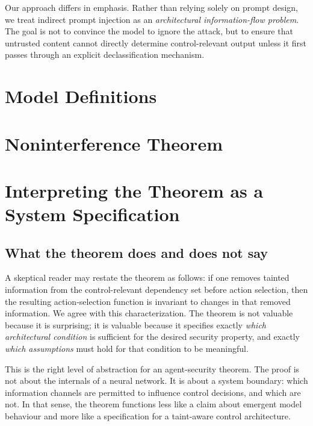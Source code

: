 \documentclass[11pt]{article}
\begin{document}
Our approach differs in emphasis. Rather than relying solely on prompt design,
we treat indirect prompt injection as an \emph{architectural information-flow
problem}. The goal is not to convince the model to ignore the attack, but to
ensure that untrusted content cannot directly determine control-relevant output
unless it first passes through an explicit declassification mechanism.

\section{Model Definitions}\label{sec:model}



\section{Noninterference Theorem}\label{sec:theorem}



\section{Interpreting the Theorem as a System Specification}
\label{sec:discussion}

\subsection{What the theorem does and does not say}

A skeptical reader may restate the theorem as follows: if one removes tainted
information from the control-relevant dependency set before action selection,
then the resulting action-selection function is invariant to changes in that
removed information. We agree with this characterization. The theorem is not
valuable because it is surprising; it is valuable because it specifies exactly
\emph{which architectural condition} is sufficient for the desired security
property, and exactly \emph{which assumptions} must hold for that condition to
be meaningful.

This is the right level of abstraction for an agent-security theorem. The proof
is not about the internals of a neural network. It is about a system boundary:
which information channels are permitted to influence control decisions, and
which are not. In that sense, the theorem functions less like a claim about
emergent model behaviour and more like a specification for a taint-aware
control architecture.
\end{document}
